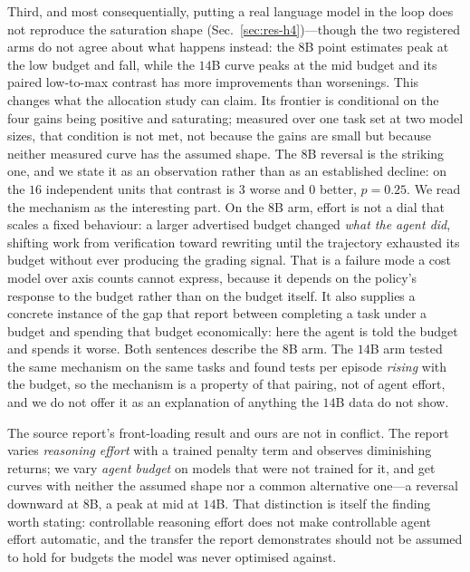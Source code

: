 \documentclass[10pt]{article} %
\begin{document}
Third, and most consequentially, putting a real language model in the loop does
not reproduce the saturation shape (Sec.~\ref{sec:res-h4})---though the two registered
arms do not agree about what happens instead: the $8$B point estimates peak at the low
budget and fall, while the $14$B curve peaks at the mid budget and its paired low-to-max
contrast has more improvements than worsenings. This changes what the allocation study can claim.
Its frontier is conditional on the four gains being positive and saturating;
measured over one task set at two model sizes, that condition is not met, not because the
gains are small but because neither measured curve has the assumed shape. The $8$B reversal
is the striking one, and we state it as an observation rather than as an established
decline: on the $16$ independent units that contrast is $3$ worse and $0$ better,
$p{=}0.25$. We read the
mechanism as the interesting part. On the $8$B arm, effort is not a dial that scales a fixed
behaviour: a larger advertised budget changed \emph{what the agent did}, shifting
work from verification toward rewriting until the trajectory exhausted its budget
without ever producing the grading signal. That is a failure mode a cost model
over axis counts cannot express, because it depends on the policy's response to
the budget rather than on the budget itself. It also supplies a concrete instance
of the gap that \citet{wu2026ecoagentbench} report between completing a task under
a budget and spending that budget economically: here the agent is told the budget
and spends it worse. Both sentences describe the $8$B arm. The $14$B arm tested the
same mechanism on the same tasks and found tests per episode \emph{rising} with the
budget, so the mechanism is a property of that pairing, not of agent effort, and we do
not offer it as an explanation of anything the $14$B data do not show.

The source report's front-loading result and ours are not in conflict. The
report varies \emph{reasoning effort} with a trained penalty term and observes
diminishing returns; we vary \emph{agent budget} on models that were not trained
for it, and get curves with neither the assumed shape nor a common alternative one---a
reversal downward at $8$B, a peak at mid at $14$B. That distinction is itself the finding worth
stating: controllable reasoning effort does not make controllable agent effort
automatic, and the transfer the report demonstrates should not be assumed to hold
for budgets the model was never optimised against.
\end{document}
